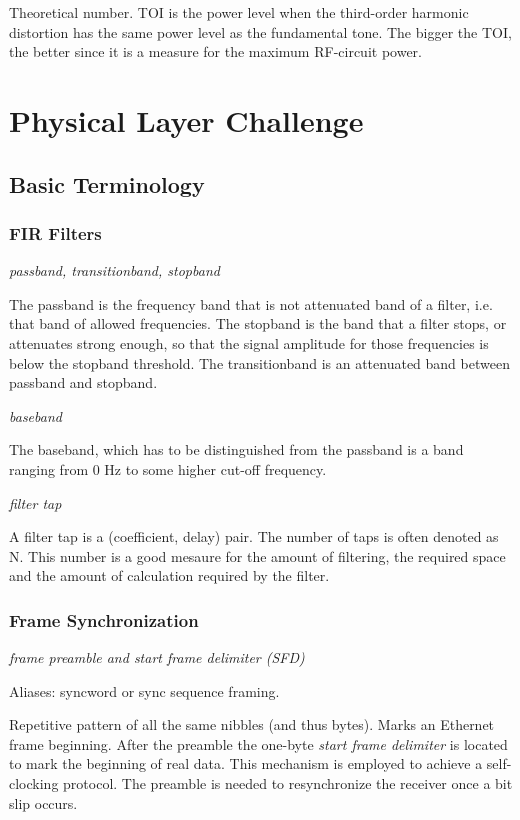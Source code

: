 \documentclass{article}
\begin{document}
Theoretical number. TOI is the power level when the third-order harmonic distortion has the same power level as the fundamental tone. The bigger the TOI, the better since it is a measure for the maximum RF-circuit power.

\section{Physical Layer Challenge}

\subsection{Basic Terminology}

\subsubsection{FIR Filters}

\emph{passband, transitionband, stopband}

The passband is the frequency band that is not attenuated band of a filter, i.e. that band of allowed frequencies. The stopband is the band that a filter stops, or attenuates strong enough, so that the signal amplitude for those frequencies is below the stopband threshold. The transitionband is an attenuated band between passband and stopband.  

\bigskip

\emph{baseband}

The baseband, which has to be distinguished from the passband is a band ranging from 0 Hz to some higher cut-off frequency. 

\bigskip

\emph{filter tap}

A filter tap is a (coefficient, delay) pair. The number of taps is often denoted as N. This number is a good mesaure for the amount of filtering, the required space and the amount of calculation required by the filter. 

\subsubsection{Frame Synchronization}

\emph{frame preamble and start frame delimiter (SFD)}

Aliases: syncword or sync sequence framing.

Repetitive pattern of all the same nibbles (and thus bytes). Marks an Ethernet frame beginning. After the preamble the one-byte \emph{start frame delimiter} is located to mark the beginning of real data. This mechanism is employed to achieve a self-clocking protocol. The preamble is needed to resynchronize the receiver once a bit slip occurs.
\end{document}
